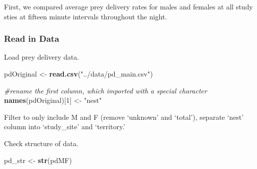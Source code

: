 \documentclass[]{article}
\newenvironment{Shaded}{\begin{snugshade}}{\end{snugshade}}
\newcommand{\CommentTok}[1]{\textcolor[rgb]{0.56,0.35,0.01}{\textit{#1}}}
\newcommand{\DataTypeTok}[1]{\textcolor[rgb]{0.13,0.29,0.53}{#1}}
\newcommand{\DecValTok}[1]{\textcolor[rgb]{0.00,0.00,0.81}{#1}}
\newcommand{\KeywordTok}[1]{\textcolor[rgb]{0.13,0.29,0.53}{\textbf{#1}}}
\newcommand{\NormalTok}[1]{#1}
\newcommand{\OperatorTok}[1]{\textcolor[rgb]{0.81,0.36,0.00}{\textbf{#1}}}
\newcommand{\OtherTok}[1]{\textcolor[rgb]{0.56,0.35,0.01}{#1}}
\newcommand{\StringTok}[1]{\textcolor[rgb]{0.31,0.60,0.02}{#1}}
\begin{document}
First, we compared average prey delivery rates for males and females at
all study sties at fifteen minute intervals throughout the night.

\hypertarget{read-in-data}{%
\subsubsection{Read in Data}\label{read-in-data}}

Load prey delivery data.

\begin{Shaded}
\begin{Highlighting}[]
\NormalTok{pdOriginal <-}\StringTok{ }\KeywordTok{read.csv}\NormalTok{(}\StringTok{"../data/pd_main.csv"}\NormalTok{)}

\CommentTok{#rename the first column, which imported with a special character}
\KeywordTok{names}\NormalTok{(pdOriginal)[}\DecValTok{1}\NormalTok{] <-}\StringTok{ "nest"}
\end{Highlighting}
\end{Shaded}

Filter to only include M and F (remove `unknown' and `total'), separate
`nest' column into `study\_site' and `territory.'

\begin{Shaded}
\end{Shaded}

Check structure of data.

\begin{Shaded}
\begin{Highlighting}[]
\NormalTok{pd_str <-}\StringTok{ }\KeywordTok{str}\NormalTok{(pdMF)}
\end{Highlighting}
\end{Shaded}
\end{document}
